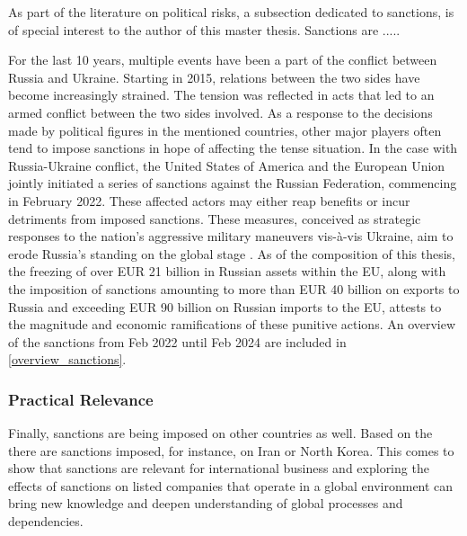 \documentclass[12pt,a4paper]{article}
\begin{document}
As part of the literature on political risks, a subsection dedicated to sanctions, is of special interest to the author of this master thesis. Sanctions are .....   

For the last 10 years, multiple events have been a part of the conflict between Russia and Ukraine. Starting in 2015, relations between the two sides have become increasingly strained. The tension was reflected in acts that led to an armed conflict between the two sides involved. As a response to the decisions made by political figures in the mentioned countries, other major players often tend to impose sanctions in hope of affecting the tense situation. In the case with Russia-Ukraine conflict, the United States of America and the European Union jointly initiated a series of sanctions against the Russian Federation, commencing in February 2022.  These affected actors may either reap benefits or incur detriments from imposed sanctions.  These measures, conceived as strategic responses to the nation's aggressive military maneuvers vis-à-vis Ukraine, aim to erode Russia's standing on the global stage \cite{council_of_the_european_union_eu_2024}. As of the composition of this thesis, the freezing of over EUR 21 billion in Russian assets within the EU, along with the imposition of sanctions amounting to more than EUR 40 billion on exports to Russia and exceeding EUR 90 billion on Russian imports to the EU, attests to the magnitude and economic ramifications of these punitive actions. An overview of the sanctions from Feb 2022 until Feb 2024 are included in \ref{overview_sanctions}.  


\subsubsection{Practical Relevance}
\label{subchap:intro_relevance_practical}

Finally, sanctions are being imposed on other countries as well. Based on the \cite{} there are sanctions imposed, for instance, on Iran or North Korea. This comes to show that sanctions are relevant for international business and exploring the effects of sanctions on listed companies that operate in a global environment can bring new knowledge and deepen understanding of global processes and dependencies. 
\end{document}

